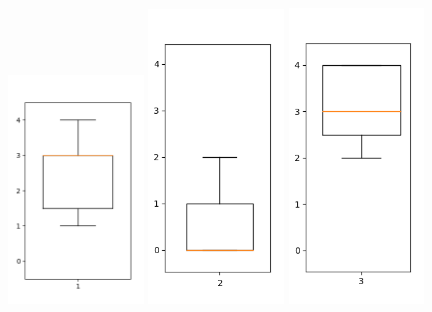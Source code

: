 \begin{figure}[h]
\centering
\includegraphics[width=0.32\textwidth]{1.png}
\includegraphics[width=0.32\textwidth]{2.png}
\includegraphics[width=0.32\textwidth]{3.png}

\end{figure}
